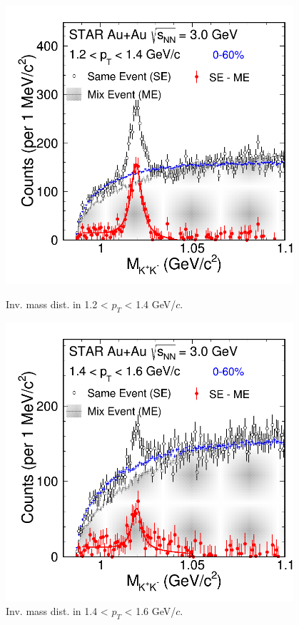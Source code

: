\begin{figure}[htbp]
\begin{minipage}[htbp]{0.55\linewidth}
\centering
\includegraphics[width=0.95\textwidth]{chapterY/fig/fig1_signal_0_6.png}
\caption{Inv. mass dist. in 1.2 < $p_T$ < 1.4 GeV/$c$. \label{fig:mixedEvent_pT6}}
\end{minipage}
\hfill
\begin{minipage}[htbp]{0.55\linewidth}
\centering
\includegraphics[width=0.95\textwidth]{chapterY/fig/fig1_signal_0_7.png} 
\caption{Inv. mass dist. in 1.4 < $p_T$ < 1.6 GeV/$c$. \label{fig:mixedEvent_pT7}}
\end{minipage}
\end{figure}

